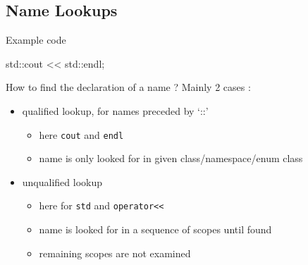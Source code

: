 \subsection[ADL]{Name Lookups}

\begin{frame}[fragile]
  \begin{exampleblock}{Example code}
    \begin{cppcode}
      std::cout << std::endl;
    \end{cppcode}
  \end{exampleblock}
  \begin{block}{How to find the declaration of a name ?}
    Mainly 2 cases :
    \begin{itemize}
    \item qualified lookup, for names preceded by `::'
      \begin{itemize}
      \item here \texttt{cout} and \texttt{endl}
      \item name is only looked for in given class/namespace/enum class
      \end{itemize}
    \item unqualified lookup
      \begin{itemize}
      \item here for \texttt{std} and \texttt{operator<<}
      \item name is looked for in a sequence of scopes until found
      \item remaining scopes are not examined
      \end{itemize}
    \end{itemize}
  \end{block}
\end{frame}

